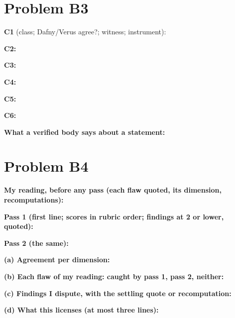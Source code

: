 \documentclass[11pt]{article}
\begin{document}
\section*{Problem B3}\label{ans:B3}
\begin{answer}
\textbf{C1} (class; Dafny/Verus agree?; witness; instrument): \vspace{1.5cm}

\textbf{C2:} \vspace{1.5cm}

\textbf{C3:} \vspace{1.5cm}

\textbf{C4:} \vspace{1.5cm}

\textbf{C5:} \vspace{1.5cm}

\textbf{C6:} \vspace{1.5cm}

\textbf{What a verified body says about a statement:} \vspace{1.5cm}
\end{answer}
\section*{Problem B4}\label{ans:B4}
\begin{answer}
\textbf{My reading, before any pass (each flaw quoted, its dimension, recomputations):} \vspace{3cm}

\textbf{Pass 1 (first line; scores in rubric order; findings at 2 or lower, quoted):} \vspace{2cm}

\textbf{Pass 2 (the same):} \vspace{2cm}

\textbf{(a) Agreement per dimension:} \vspace{1cm}

\textbf{(b) Each flaw of my reading: caught by pass 1, pass 2, neither:} \vspace{2cm}

\textbf{(c) Findings I dispute, with the settling quote or recomputation:} \vspace{1.5cm}

\textbf{(d) What this licenses (at most three lines):} \vspace{1cm}
\end{answer}
\end{document}
